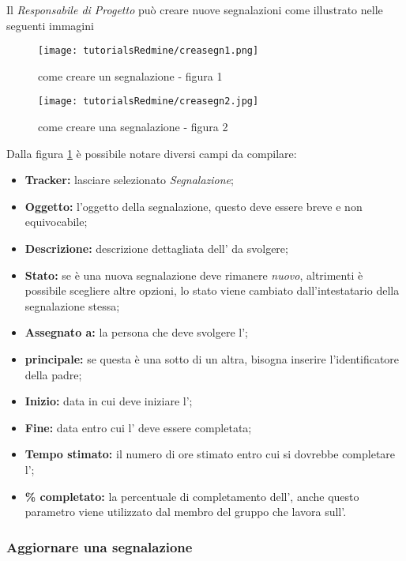 \documentclass{scalatekids-article}
\begin{document}
Il \textit{Responsabile di Progetto} può creare nuove segnalazioni come illustrato nelle seguenti immagini
\begin{figure}[H]
    \centering
    \texttt{[image: tutorialsRedmine/creasegn1.png]}
    \caption{come creare un segnalazione - figura 1}
\end{figure}
\begin{figure}[H]
    \centering
    \texttt{[image: tutorialsRedmine/creasegn2.jpg]}
    \caption{come creare una segnalazione - figura 2\label{fig:crea-segnalazione-2}}
\end{figure}
Dalla figura \ref{fig:crea-segnalazione-2} è possibile notare diversi campi da compilare:
\begin{itemize}
    \item \textbf{Tracker:} lasciare selezionato \textit{Segnalazione};
    \item \textbf{Oggetto:} l'oggetto della segnalazione, questo deve essere breve e non equivocabile;
    \item \textbf{Descrizione:} descrizione dettagliata dell' da svolgere;
    \item \textbf{Stato:} se è una nuova segnalazione deve rimanere \textit{nuovo}, altrimenti è possibile scegliere altre opzioni, lo stato viene cambiato dall'intestatario della segnalazione stessa;
    \item \textbf{Assegnato a:} la persona che deve svolgere l';
    \item \textbf{ principale:} se questa è una sotto  di un altra, bisogna inserire l'identificatore della  padre;
    \item \textbf{Inizio:} data in cui deve iniziare l';
    \item \textbf{Fine:} data entro cui l' deve essere completata;
    \item \textbf{Tempo stimato:} il numero di ore stimato entro cui si dovrebbe completare l';
    \item \textbf{\% completato:} la percentuale di completamento dell', anche questo parametro viene utilizzato dal membro del gruppo che lavora sull'.
    \end{itemize}

    \subsubsection{Aggiornare una segnalazione}
\end{document}
